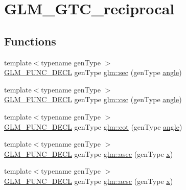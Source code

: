 \hypertarget{group__gtc__reciprocal}{}\section{G\+L\+M\+\_\+\+G\+T\+C\+\_\+reciprocal}
\label{group__gtc__reciprocal}
\subsection*{Functions}
\begin{DoxyCompactItemize}
\item 
{\footnotesize template$<$typename gen\+Type $>$ }\\\hyperlink{setup_8hpp_ab2d052de21a70539923e9bcbf6e83a51}{G\+L\+M\+\_\+\+F\+U\+N\+C\+\_\+\+D\+E\+CL} gen\+Type \hyperlink{group__gtc__reciprocal_gae4bcbebee670c5ea155f0777b3acbd84}{glm\+::sec} (gen\+Type \hyperlink{_s_d_l__opengl__glext_8h_a9e06c1f76a20fed54ca742cd25cb02c4}{angle})
\item 
{\footnotesize template$<$typename gen\+Type $>$ }\\\hyperlink{setup_8hpp_ab2d052de21a70539923e9bcbf6e83a51}{G\+L\+M\+\_\+\+F\+U\+N\+C\+\_\+\+D\+E\+CL} gen\+Type \hyperlink{group__gtc__reciprocal_ga59dd0005b6474eea48af743b4f14ebbb}{glm\+::csc} (gen\+Type \hyperlink{_s_d_l__opengl__glext_8h_a9e06c1f76a20fed54ca742cd25cb02c4}{angle})
\item 
{\footnotesize template$<$typename gen\+Type $>$ }\\\hyperlink{setup_8hpp_ab2d052de21a70539923e9bcbf6e83a51}{G\+L\+M\+\_\+\+F\+U\+N\+C\+\_\+\+D\+E\+CL} gen\+Type \hyperlink{group__gtc__reciprocal_ga3a7b517a95bbd3ad74da3aea87a66314}{glm\+::cot} (gen\+Type \hyperlink{_s_d_l__opengl__glext_8h_a9e06c1f76a20fed54ca742cd25cb02c4}{angle})
\item 
{\footnotesize template$<$typename gen\+Type $>$ }\\\hyperlink{setup_8hpp_ab2d052de21a70539923e9bcbf6e83a51}{G\+L\+M\+\_\+\+F\+U\+N\+C\+\_\+\+D\+E\+CL} gen\+Type \hyperlink{group__gtc__reciprocal_ga2c5b7f962c2c9ff684e6d2de48db1f10}{glm\+::asec} (gen\+Type \hyperlink{_s_d_l__opengl_8h_ad0e63d0edcdbd3d79554076bf309fd47}{x})
\item 
{\footnotesize template$<$typename gen\+Type $>$ }\\\hyperlink{setup_8hpp_ab2d052de21a70539923e9bcbf6e83a51}{G\+L\+M\+\_\+\+F\+U\+N\+C\+\_\+\+D\+E\+CL} gen\+Type \hyperlink{group__gtc__reciprocal_ga1b4bed91476b9b915e76b4a30236d330}{glm\+::acsc} (gen\+Type \hyperlink{_s_d_l__opengl_8h_ad0e63d0edcdbd3d79554076bf309fd47}{x})

\end{DoxyCompactItemize}

